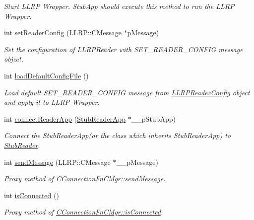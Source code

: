 \begin{DoxyCompactItemize}
\begin{DoxyCompactList}\small\item\em Start L\-L\-R\-P Wrapper. Stub\-App should execute this method to run the L\-L\-R\-P Wrapper. \end{DoxyCompactList}\item 
int \hyperlink{class_e_l_f_i_n_1_1_l_l_r_p_core_ab35aa971a25103f0e288bf6cdbd198d0}{set\-Reader\-Config} (L\-L\-R\-P\-::\-C\-Message $\ast$p\-Message)
\begin{DoxyCompactList}\small\item\em Set the configuration of L\-L\-R\-P\-Reader with S\-E\-T\-\_\-\-R\-E\-A\-D\-E\-R\-\_\-\-C\-O\-N\-F\-I\-G message object. \end{DoxyCompactList}\item 
int \hyperlink{class_e_l_f_i_n_1_1_l_l_r_p_core_a606a6a467e33b1727e48a283990d0383}{load\-Default\-Config\-File} ()
\begin{DoxyCompactList}\small\item\em Load default S\-E\-T\-\_\-\-R\-E\-A\-D\-E\-R\-\_\-\-C\-O\-N\-F\-I\-G message from \hyperlink{class_e_l_f_i_n_1_1_l_l_r_p_reader_config}{L\-L\-R\-P\-Reader\-Config} object and apply it to L\-L\-R\-P Wrapper. \end{DoxyCompactList}\item 
int \hyperlink{class_e_l_f_i_n_1_1_l_l_r_p_core_a9aebe95ba139b752ad0575c483ec6f8a}{connect\-Reader\-App} (\hyperlink{class_e_l_f_i_n_1_1_stub_reader_app}{Stub\-Reader\-App} $\ast$\-\_\-\-\_\-p\-Stub\-App)
\begin{DoxyCompactList}\small\item\em Connect the Stub\-Reader\-App(or the class which inherits Stub\-Reader\-App) to \hyperlink{class_e_l_f_i_n_1_1_stub_reader}{Stub\-Reader}. \end{DoxyCompactList}\item 
int \hyperlink{class_e_l_f_i_n_1_1_l_l_r_p_core_abcc0f5f2a372cffaaf1ece1c4397576e}{send\-Message} (L\-L\-R\-P\-::\-C\-Message $\ast$\-\_\-\-\_\-p\-Message)
\begin{DoxyCompactList}\small\item\em Proxy method of \hyperlink{class_e_l_f_i_n_1_1_c_connection_fn_c_mgr_a48b283f30ddd8c2b0c2ed55e844085f8}{C\-Connection\-Fn\-C\-Mgr\-::send\-Message}. \end{DoxyCompactList}\item 
int \hyperlink{class_e_l_f_i_n_1_1_l_l_r_p_core_a37541d7698fb45e69c96c5d4b864d30a}{is\-Connected} ()
\begin{DoxyCompactList}\small\item\em Proxy method of \hyperlink{class_e_l_f_i_n_1_1_c_connection_fn_c_mgr_aa27f8bb83349b52dffe670824cfa0e53}{C\-Connection\-Fn\-C\-Mgr\-::is\-Connected}. \end{DoxyCompactList}\end{DoxyCompactItemize}
